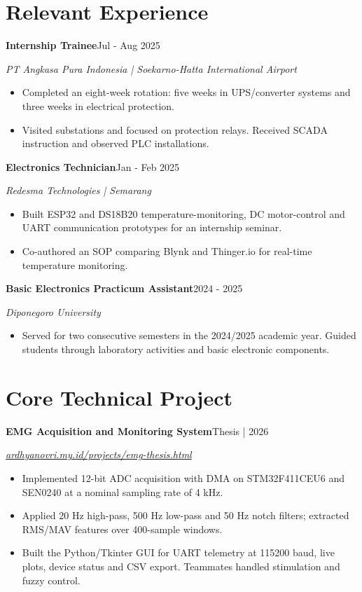 \documentclass[11pt,a4paper]{article}
\newcommand{\entry}[3]{\Needspace{4\baselineskip}\textbf{#1}\hfill #2\par\textit{#3}\par}
\begin{document}
\section{Relevant Experience}
\entry{Internship Trainee}{Jul - Aug 2025}{PT Angkasa Pura Indonesia | Soekarno-Hatta International Airport}
\begin{itemize}
\item Completed an eight-week rotation: five weeks in UPS/converter systems and three weeks in electrical protection.
\item Visited substations and focused on protection relays. Received SCADA instruction and observed PLC installations.
\end{itemize}
\entry{Electronics Technician}{Jan - Feb 2025}{Redesma Technologies | Semarang}
\begin{itemize}
\item Built ESP32 and DS18B20 temperature-monitoring, DC motor-control and UART communication prototypes for an internship seminar.
\item Co-authored an SOP comparing Blynk and Thinger.io for real-time temperature monitoring.
\end{itemize}
\entry{Basic Electronics Practicum Assistant}{2024 - 2025}{Diponegoro University}
\begin{itemize}
\item Served for two consecutive semesters in the 2024/2025 academic year. Guided students through laboratory activities and basic electronic components.
\end{itemize}
\section{Core Technical Project}
\entry{EMG Acquisition and Monitoring System}{Thesis | 2026}{\href{https://ardhyanovri.my.id/projects/emg-thesis.html}{ardhyanovri.my.id/projects/emg-thesis.html}}
\begin{itemize}
\item Implemented 12-bit ADC acquisition with DMA on STM32F411CEU6 and SEN0240 at a nominal sampling rate of 4 kHz.
\item Applied 20 Hz high-pass, 500 Hz low-pass and 50 Hz notch filters; extracted RMS/MAV features over 400-sample windows.
\item Built the Python/Tkinter GUI for UART telemetry at 115200 baud, live plots, device status and CSV export. Teammates handled stimulation and fuzzy control.
\end{itemize}
\newpage
\end{document}
